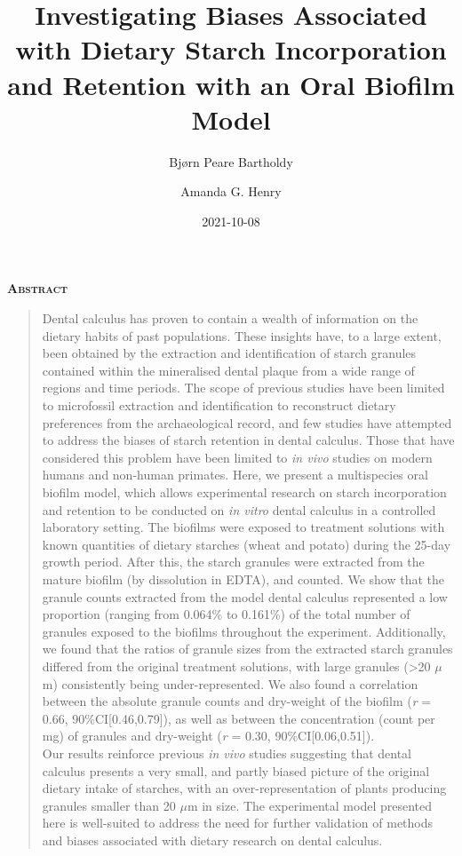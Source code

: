 \documentclass[
]{article}
\title{Investigating Biases Associated with Dietary Starch Incorporation and Retention with an Oral Biofilm Model}
\author{Bjørn Peare Bartholdy \and Amanda G. Henry}
\date{2021-10-08}
\renewenvironment{abstract}
{
  \centerline
  {\large \bfseries \scshape Abstract}
  \begin{quote}
}
{
  \end{quote}
}
\begin{document}
\maketitle
\begin{abstract}
Dental calculus has proven to contain a wealth of information
on the dietary habits of past populations. These insights have, to a large extent,
been obtained by the extraction and identification of
starch granules contained within the mineralised dental plaque from a wide range
of regions and time periods. The scope of previous studies have been limited to
microfossil extraction and identification to reconstruct dietary preferences from
the archaeological record, and few studies have attempted to address the biases
of starch retention in dental calculus. Those that have considered this problem
have been limited to \emph{in vivo} studies on modern humans and non-human primates.
Here, we present a multispecies oral biofilm model, which allows experimental
research on starch incorporation and retention to be conducted on \emph{in vitro}
dental calculus in a controlled laboratory setting. The biofilms were exposed
to treatment solutions with known quantities of
dietary starches (wheat and potato) during the 25-day growth period. After this,
the starch granules were extracted from the mature biofilm (by dissolution in EDTA),
and counted. We show that the granule counts extracted from the model dental calculus
represented a low proportion (ranging from 0.064\% to 0.161\%) of the total number
of granules exposed to the biofilms throughout the experiment.
Additionally, we found that the ratios of granule sizes from the extracted
starch granules differed from the original treatment solutions, with large
granules (\textgreater20 \(\mu\)m) consistently being under-represented.
We also found a correlation
between the absolute granule counts and dry-weight of the biofilm
(\emph{r} = 0.66, 90\%CI{[}0.46,0.79{]}), as well
as between the concentration (count per mg) of granules and dry-weight
(\emph{r} = 0.30, 90\%CI{[}0.06,0.51{]}).\\
Our results reinforce previous \emph{in vivo} studies suggesting that dental calculus
presents a very small, and partly biased picture of the original dietary intake
of starches, with an over-representation of plants producing granules smaller than
20 \(\mu\)m in size. The experimental model presented here is well-suited to address
the need for further validation of methods and biases associated with dietary
research on dental calculus.
\end{abstract}
\end{document}
